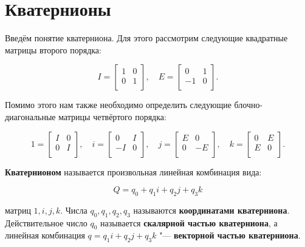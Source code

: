 \section{Кватернионы}

Введём понятие кватерниона. Для этого рассмотрим следующие квадратные матрицы второго порядка:

$$
I=
\left[ { \begin{array}{cc}
    1 & 0 \\
    0 & 1 \\
\end{array} }\right],
\quad
E=
\left[ { \begin{array}{cc}
    0 & 1 \\
    -1 & 0 \\
\end{array} }\right].
$$

Помимо этого нам также необходимо определить следующие блочно-диаго\-нальные матрицы четвёртого порядка:

$$
1=
\left[ { \begin{array}{cc}
    I & 0 \\
    0 & I \\
\end{array} }\right],
\quad
i=
\left[ { \begin{array}{cc}
    0 & I \\
    -I & 0 \\
\end{array} }\right],
\quad
j=
\left[ { \begin{array}{cc}
    E & 0 \\
    0 & -E \\
\end{array} }\right],
\quad
k=
\left[ { \begin{array}{cc}
    0 & E \\
    E & 0 \\
\end{array} }\right].
$$

\begin{definition}
\textbf{Кватернионом} называется произвольная линейная комбинация вида:

$$
Q=q_0+q_1i+q_2j+q_3k
$$

\noindent матриц $1,i,j,k$. Числа $q_0,q_1,q_2,q_3$ называются \textbf{координатами кватерниона}. Действительное
число $q_0$ называется \textbf{скалярной частью кватерниона}, а линейная комбинация $q=q_1i+q_2j+q_3k$ "---
\textbf{векторной частью кватерниона}.
\end{definition}

